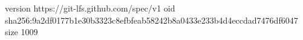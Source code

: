 version https://git-lfs.github.com/spec/v1
oid sha256:9a2df0177b1e30b3323c8efbfeab58242b8a0433e233b4d4eccdad7476df6047
size 1009
